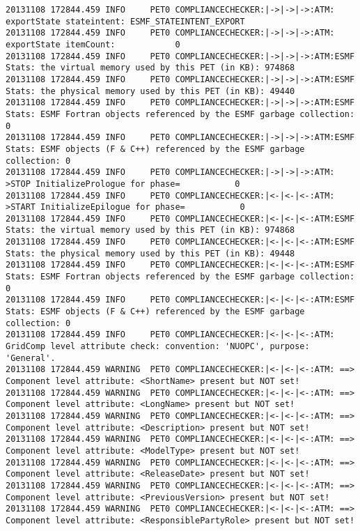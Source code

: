 {\begin{verbatim}
20131108 172844.459 INFO     PET0 COMPLIANCECHECKER:|->|->|->:ATM: exportState stateintent: ESMF_STATEINTENT_EXPORT
20131108 172844.459 INFO     PET0 COMPLIANCECHECKER:|->|->|->:ATM: exportState itemCount:            0
20131108 172844.459 INFO     PET0 COMPLIANCECHECKER:|->|->|->:ATM:ESMF Stats: the virtual memory used by this PET (in KB): 974868
20131108 172844.459 INFO     PET0 COMPLIANCECHECKER:|->|->|->:ATM:ESMF Stats: the physical memory used by this PET (in KB): 49440
20131108 172844.459 INFO     PET0 COMPLIANCECHECKER:|->|->|->:ATM:ESMF Stats: ESMF Fortran objects referenced by the ESMF garbage collection: 0
20131108 172844.459 INFO     PET0 COMPLIANCECHECKER:|->|->|->:ATM:ESMF Stats: ESMF objects (F & C++) referenced by the ESMF garbage collection: 0
20131108 172844.459 INFO     PET0 COMPLIANCECHECKER:|->|->|->:ATM: >STOP InitializePrologue for phase=           0
20131108 172844.459 INFO     PET0 COMPLIANCECHECKER:|<-|<-|<-:ATM: >START InitializeEpilogue for phase=           0
20131108 172844.459 INFO     PET0 COMPLIANCECHECKER:|<-|<-|<-:ATM:ESMF Stats: the virtual memory used by this PET (in KB): 974868
20131108 172844.459 INFO     PET0 COMPLIANCECHECKER:|<-|<-|<-:ATM:ESMF Stats: the physical memory used by this PET (in KB): 49448
20131108 172844.459 INFO     PET0 COMPLIANCECHECKER:|<-|<-|<-:ATM:ESMF Stats: ESMF Fortran objects referenced by the ESMF garbage collection: 0
20131108 172844.459 INFO     PET0 COMPLIANCECHECKER:|<-|<-|<-:ATM:ESMF Stats: ESMF objects (F & C++) referenced by the ESMF garbage collection: 0
20131108 172844.459 INFO     PET0 COMPLIANCECHECKER:|<-|<-|<-:ATM: GridComp level attribute check: convention: 'NUOPC', purpose: 'General'.
20131108 172844.459 WARNING  PET0 COMPLIANCECHECKER:|<-|<-|<-:ATM: ==> Component level attribute: <ShortName> present but NOT set!
20131108 172844.459 WARNING  PET0 COMPLIANCECHECKER:|<-|<-|<-:ATM: ==> Component level attribute: <LongName> present but NOT set!
20131108 172844.459 WARNING  PET0 COMPLIANCECHECKER:|<-|<-|<-:ATM: ==> Component level attribute: <Description> present but NOT set!
20131108 172844.459 WARNING  PET0 COMPLIANCECHECKER:|<-|<-|<-:ATM: ==> Component level attribute: <ModelType> present but NOT set!
20131108 172844.459 WARNING  PET0 COMPLIANCECHECKER:|<-|<-|<-:ATM: ==> Component level attribute: <ReleaseDate> present but NOT set!
20131108 172844.459 WARNING  PET0 COMPLIANCECHECKER:|<-|<-|<-:ATM: ==> Component level attribute: <PreviousVersion> present but NOT set!
20131108 172844.459 WARNING  PET0 COMPLIANCECHECKER:|<-|<-|<-:ATM: ==> Component level attribute: <ResponsiblePartyRole> present but NOT set!

\end{verbatim}}
